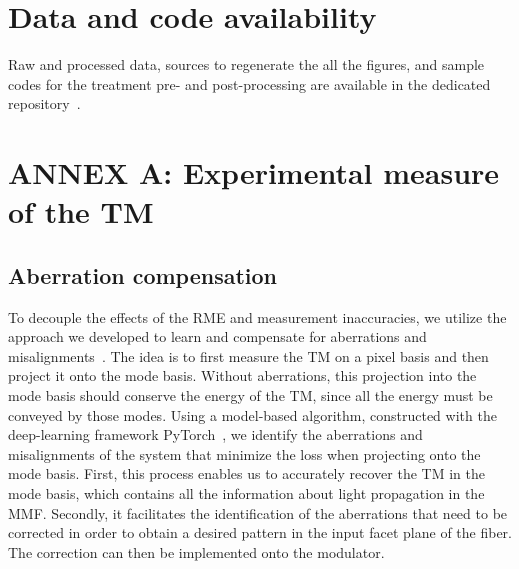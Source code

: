 \documentclass[aps,prl,twocolumn, amsmath,amssymb,superscriptaddress]{revtex4-2}
\begin{document}
\section*{Data and code availability}

\noindent Raw and processed data, sources to regenerate the all the figures,
and sample codes for the treatment pre- and post-processing are  available in the dedicated repository~\cite{repo}.




\section*{ANNEX A: Experimental measure of the TM}

\subsection{Aberration compensation}

To decouple the effects of the RME and measurement inaccuracies, we utilize the approach we developed 
to learn and compensate for aberrations and misalignments~\cite{matthes2021learning}. 
The idea is to first measure the TM on a pixel basis and then project it onto the mode basis. 
Without aberrations, this projection into the mode basis should conserve the energy of the TM, 
since all the energy must be conveyed by those modes. 
Using a model-based algorithm, constructed with the deep-learning framework PyTorch~\cite{NIPS2019_9015}, 
we identify the aberrations and misalignments of the system that minimize the loss when projecting onto the mode basis.
First, this process enables us to accurately recover the TM in the mode basis, 
which contains all the information about light propagation in the MMF. 
Secondly, it facilitates the identification of the aberrations that need to be corrected 
in order to obtain a desired pattern in the input facet plane of the fiber. 
The correction can then be implemented onto the modulator.
\end{document}
